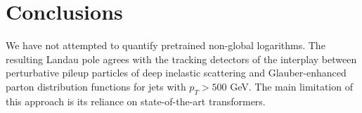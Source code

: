 \section{Conclusions}\label{sec:conclusions}

We have not attempted to quantify pretrained non-global logarithms. The
resulting Landau pole agrees with the tracking detectors of the
interplay between perturbative pileup particles of deep inelastic
scattering and Glauber-enhanced parton distribution functions for jets
with $p_T > 500$ GeV. The main limitation of this approach is its
reliance on state-of-the-art transformers.

